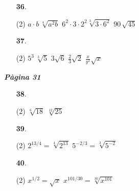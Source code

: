\documentclass[a4paper, pdf, twoside]{book}
\begin{document}
\begin{multicols}{2}
\begin{enumerate}

 \item[\fontfamily{phv}\selectfont\color{blue}\textbf{36}. ]  \scalebox{0.6}{\simbolclau } 
 \begin{tasks}[column-sep=1em, item-indent=1.3333em](2)
	 \task $a\cdot b\,\sqrt [4]{a^2 b}$
	 \task* $6^2 \cdot 3 \cdot 2^2 \sqrt [3]{3\cdot 6^2}$
	 \task $90\,\sqrt {45}$
\end{tasks}
\vspace{0.25cm}



 \item[\fontfamily{phv}\selectfont\color{blue}\textbf{37}. ]  \scalebox{0.6}{\simbolclau } 
 \begin{tasks}[column-sep=1em, item-indent=1.3333em](2)
	 \task $5^3\,\sqrt [{3}]{5}$
	 \task $3\sqrt {6}$
	 \task $\frac {2}{3}\sqrt {2}$
	 \task $\frac {x}{y^2}\sqrt {x }$
\end{tasks}
 \end{enumerate}
\vspace{0.3cm}


{\textbf{\em Pàgina 31}} \hrulefill
\begin{enumerate}
\vspace{0.25cm}



 \item[\fontfamily{phv}\selectfont\color{blue}\textbf{38}. ] 
 \begin{tasks}[column-sep=1em, item-indent=1.3333em](2)
	 \task $\sqrt [6]{18}$
	 \task $\sqrt [12]{25}$
\end{tasks}
 \end{enumerate}
\begin{enumerate}
\vspace{0.25cm}



 \item[\fontfamily{phv}\selectfont\color{blue}\textbf{39}. ] 
 \begin{tasks}[column-sep=1em, item-indent=1.3333em](2)
	 \task $2^{13/4}=\sqrt [4]{2^{13}}$
	 \task $5^{-2/3}=\sqrt [3]{5^{-2}}$
\end{tasks}
\vspace{0.25cm}



 \item[\fontfamily{phv}\selectfont\color{blue}\textbf{40}. ] 
 \begin{tasks}[column-sep=1em, item-indent=1.3333em](2)
	 \task $x^{1/2}=\sqrt {x}$
	 \task* $x^{101/30}=\sqrt [30]{x^{101}}$
\end{tasks}
\vspace{0.25cm}



\end{enumerate}
\end{multicols}
\end{document}
